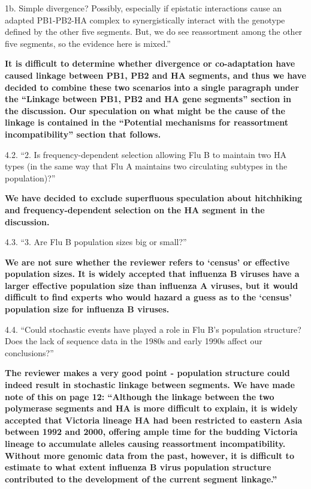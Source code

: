 \documentclass[11pt,oneside,letterpaper]{article}
\begin{document}
1b.  Simple divergence?
Possibly, especially if epistatic interactions cause an adapted PB1-PB2-HA complex to synergistically interact with the genotype defined by the other five segments.
But, we do see reassortment among the other five segments, so the evidence here is mixed.''

\textbf{It is difficult to determine whether divergence or co-adaptation have caused linkage between PB1, PB2 and HA segments, and thus we have decided to combine these two scenarios into a single paragraph under the ``Linkage between PB1, PB2 and HA gene segments'' section in the discussion.
Our speculation on what might be the cause of the linkage is contained in the ``Potential mechanisms for reassortment incompatibility'' section that follows.}

4.2. ``2. Is frequency-dependent selection allowing Flu B to maintain two HA types (in the same way that Flu A maintains two circulating subtypes in the population)?''

\textbf{We have decided to exclude superfluous speculation about hitchhiking and frequency-dependent selection on the HA segment in the discussion.}

4.3. ``3. Are Flu B population sizes big or small?''

\textbf{We are not sure whether the reviewer refers to `census' or effective population sizes.
It is widely accepted that influenza B viruses have a larger effective population size than influenza A viruses, but it would difficult to find experts who would hazard a guess as to the `census' population size for influenza B viruses.}

4.4. ``Could stochastic events have played a role in Flu B's population structure?
Does the lack of sequence data in the 1980s and early 1990s affect our conclusions?''

\textbf{The reviewer makes a very good point - population structure could indeed result in stochastic linkage between segments.
We have made note of this on page 12:
``Although the linkage between the two polymerase segments and HA is more difficult to explain, it is widely accepted that Victoria lineage HA had been restricted to eastern Asia between 1992 and 2000, offering ample time for the budding Victoria lineage to accumulate alleles causing reassortment incompatibility.
Without more genomic data from the past, however, it is difficult to estimate to what extent influenza B virus population structure contributed to the development of the current segment linkage.''}
\end{document}
